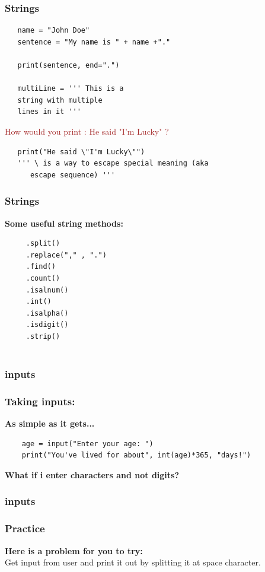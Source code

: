 \documentclass[12pt, aspectratio=169]{beamer}
\begin{document}
\begin{frame}[fragile]
  \frametitle{Strings}
\begin{verbatim}
   name = "John Doe"
   sentence = "My name is " + name +"."

   print(sentence, end=".")

   multiLine = ''' This is a
   string with multiple
   lines in it '''
\end{verbatim}
  \pause
  \textcolor{brown}{How would you print :  He said "I'm Lucky" ?} 
  \pause
  \begin{verbatim}
   print("He said \"I'm Lucky\"")  
   ''' \ is a way to escape special meaning (aka
      escape sequence) '''
\end{verbatim}
  \vspace{.5em}
\end{frame}

\begin{frame}[fragile]
  \frametitle{Strings}
\textbf{Some useful string methods: }
\begin{verbatim}
     .split()
     .replace("," , ".")
     .find()
     .count()
     .isalnum()
     .int()
     .isalpha()
     .isdigit()
     .strip()
     
\end{verbatim}
\end{frame}


\subsubsection{inputs}
\begin{frame}[fragile]
  \frametitle{Taking inputs: }
\textbf{As simple as it gets...} \\
\vspace{1em}
\begin{verbatim}
    age = input("Enter your age: ")
    print("You've lived for about", int(age)*365, "days!")
\end{verbatim}
\vspace{2em}\pause
\textbf{What if i enter characters and not digits?}
\vspace{2em}

\end{frame}

\subsubsection{inputs}
\begin{frame}[fragile]
  \frametitle{Practice}
     \textbf{   Here is a problem for you to try: }\\ 
    \vspace{1em}
Get input from user and print it out by splitting it at space character.
\end{frame}
\end{document}
